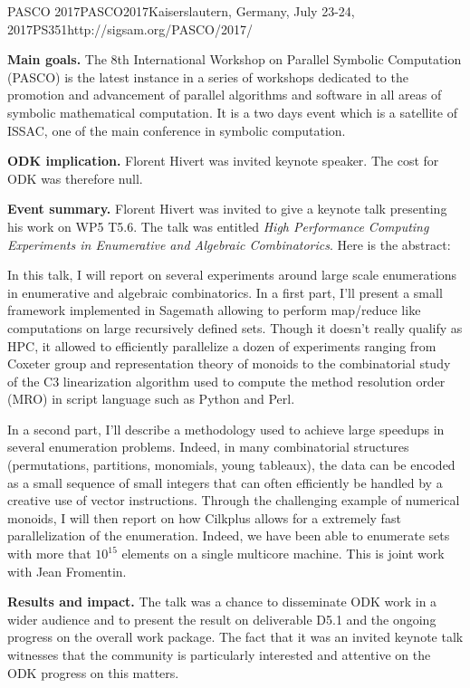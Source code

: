\begin{event}{PASCO 2017}{PASCO2017}{Kaiserslautern, Germany, July 23-24, 2017}{PS}{35}{1}{http://sigsam.org/PASCO/2017/}

\textbf{Main goals.}
The 8th International Workshop on Parallel Symbolic Computation (PASCO) is the
latest instance in a series of workshops dedicated to the promotion and
advancement of parallel algorithms and software in all areas of symbolic
mathematical computation. It is a two days event which is a satellite of
ISSAC, one of the main conference in symbolic computation.

\textbf{ODK implication.} Florent Hivert was invited keynote speaker. The cost
for ODK was therefore null.

\textbf{Event summary.}
Florent Hivert was invited to give a keynote talk presenting his work on WP5
T5.6. The talk was entitled \emph{High Performance Computing Experiments in
  Enumerative and Algebraic Combinatorics}. Here is the abstract:

In this talk, I will report on several experiments around large scale
enumerations in enumerative and algebraic combinatorics.  In a first part,
I'll present a small framework implemented in Sagemath allowing to perform
map/reduce like computations on large recursively defined sets. Though it
doesn't really qualify as HPC, it allowed to efficiently parallelize a dozen
of experiments ranging from Coxeter group and representation theory of monoids
to the combinatorial study of the C3 linearization algorithm used to compute
the method resolution order (MRO) in script language such as Python and Perl.

In a second part, I'll describe a methodology used to achieve large speedups
in several enumeration problems. Indeed, in many combinatorial structures
(permutations, partitions, monomials, young tableaux), the data can be encoded
as a small sequence of small integers that can often efficiently be handled by
a creative use of vector instructions. Through the challenging example of
numerical monoids, I will then report on how Cilkplus allows for a extremely
fast parallelization of the enumeration. Indeed, we have been able to
enumerate sets with more that $10^15$ elements on a single multicore machine.
This is joint work with Jean Fromentin.

\textbf{Results and impact.} The talk was a chance to disseminate ODK work in
a wider audience and to present the result on deliverable D5.1 and the ongoing
progress on the overall work package. The fact that it was an invited keynote
talk witnesses that the community is particularly interested and attentive on
the ODK progress on this matters.

\end{event}
